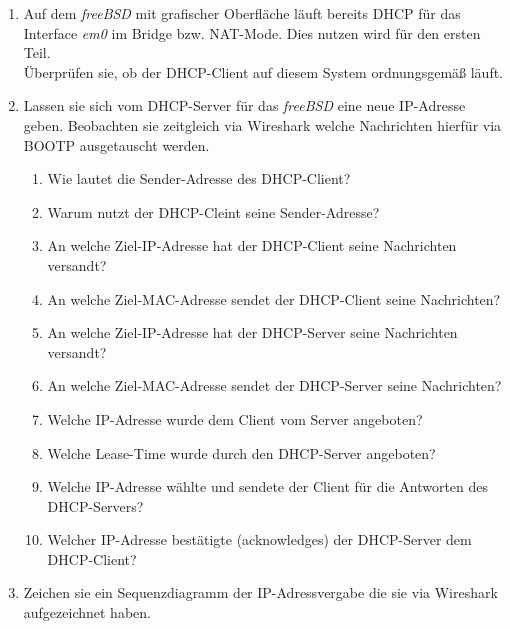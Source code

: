 \documentclass[paper=a4,fontsize=11pt]{scrartcl}%
\numberwithin{equation}{section}
\begin{document}
\begin{enumerate}
	\item Auf dem \emph{freeBSD} mit grafischer Oberfläche läuft bereits DHCP für das Interface \emph{em0} im Bridge bzw. NAT-Mode. Dies nutzen wird für den ersten Teil.\\
	Überprüfen sie, ob der DHCP-Client auf diesem System ordnungsgemäß läuft.
	\item Lassen sie sich vom DHCP-Server für das \emph{freeBSD} eine neue IP-Adresse geben. Beobachten sie zeitgleich via Wireshark welche Nachrichten hierfür via BOOTP ausgetauscht werden.
	\begin{enumerate}[label=(\alph*)]
		\item Wie lautet die Sender-Adresse des DHCP-Client?
		\item Warum nutzt der DHCP-Cleint seine Sender-Adresse?
		\item An welche Ziel-IP-Adresse hat der DHCP-Client seine Nachrichten versandt?
		\item An welche Ziel-MAC-Adresse sendet der DHCP-Client seine Nachrichten?
		\item An welche Ziel-IP-Adresse hat der DHCP-Server seine Nachrichten versandt?
		\item An welche Ziel-MAC-Adresse sendet der DHCP-Server seine Nachrichten?
		\item Welche IP-Adresse wurde dem Client vom Server angeboten?
		\item Welche Lease-Time wurde durch den DHCP-Server angeboten?
		\item Welche IP-Adresse wählte und sendete der Client für die Antworten des DHCP-Servers?
		\item Welcher IP-Adresse bestätigte (acknowledges) der DHCP-Server dem DHCP-Client?
	\end{enumerate}
	\item Zeichen sie ein Sequenzdiagramm der IP-Adressvergabe die sie via Wireshark aufgezeichnet haben.
\end{enumerate}
\end{document}
